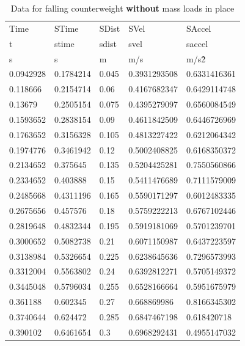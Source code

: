 \documentclass[coverpage]{article}
\begin{document}
	\begin{table}[!ht]
		\caption{Data for falling counterweight \textbf{without} mass loads in place}
		\label{table:with-masses-table}
		\vspace{.1in}
		
		\centering
		\begin{tabular}{|l|l|l|l|l|}
			Time & STime & SDist & SVel & SAccel \\
			t & stime & sdist & svel & saccel \\ \hline
			s & s & m & m/s & m/s\^2 \\ \hline
			0.0942928 & 0.1784214 & 0.045 & 0.3931293508 & 0.6331416361 \\ \hline
			0.118666 & 0.2154714 & 0.06 & 0.4167682347 & 0.6429114748 \\ \hline
			0.13679 & 0.2505154 & 0.075 & 0.4395279097 & 0.6560084549 \\ \hline
			0.1593652 & 0.2838154 & 0.09 & 0.4611842509 & 0.6446726969 \\ \hline
			0.1763652 & 0.3156328 & 0.105 & 0.4813227422 & 0.6212064342 \\ \hline
			0.1974776 & 0.3461942 & 0.12 & 0.5002408825 & 0.6168350372 \\ \hline
			0.2134652 & 0.375645 & 0.135 & 0.5204425281 & 0.7550560866 \\ \hline
			0.2334652 & 0.403888 & 0.15 & 0.5411476689 & 0.7111579009 \\ \hline
			0.2485668 & 0.4311196 & 0.165 & 0.5590171297 & 0.6012483335 \\ \hline
			0.2675656 & 0.457576 & 0.18 & 0.5759222213 & 0.6767102446 \\ \hline
			0.2819648 & 0.4832344 & 0.195 & 0.5919181069 & 0.5701239701 \\ \hline
			0.3000652 & 0.5082738 & 0.21 & 0.6071150987 & 0.6437223597 \\ \hline
			0.3138984 & 0.5326654 & 0.225 & 0.6238645636 & 0.7296573993 \\ \hline
			0.3312004 & 0.5563802 & 0.24 & 0.6392812271 & 0.5705149372 \\ \hline
			0.3445048 & 0.5796034 & 0.255 & 0.6528166664 & 0.5951675979 \\ \hline
			0.361188 & 0.602345 & 0.27 & 0.668869986 & 0.8166345302 \\ \hline
			0.3740644 & 0.624472 & 0.285 & 0.6847467198 & 0.618420718 \\ \hline
			0.390102 & 0.6461654 & 0.3 & 0.6968292431 & 0.4955147032 \\ \hline

\end{tabular}
\end{table}
\end{document}

